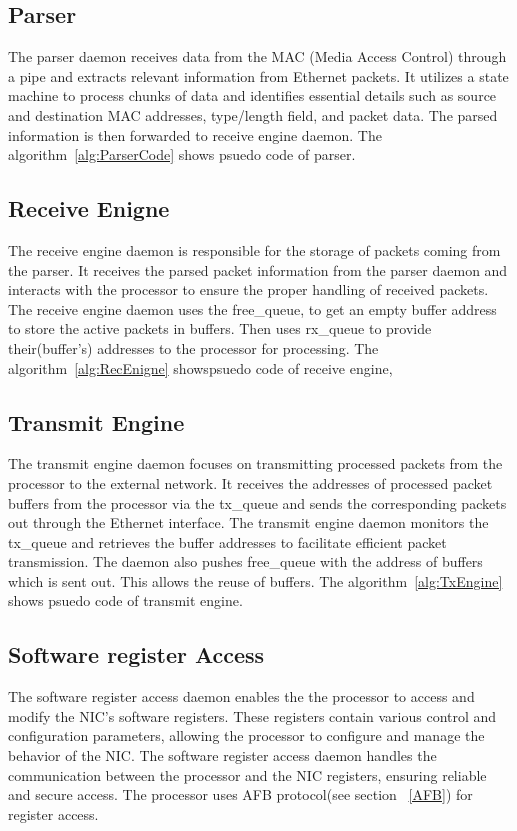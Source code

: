 \documentclass[12pt]{report}
\begin{document}
		\subsection{Parser}
				The parser daemon receives data from the MAC (Media Access Control) through a pipe and extracts relevant information from Ethernet packets. It utilizes a state machine to process chunks of data and identifies essential details such as source and destination MAC addresses, type/length field, and packet data. The parsed information is then forwarded to receive engine daemon. The algorithm~\ref{alg:ParserCode} shows psuedo code of parser.

		\subsection{Receive Enigne}
				The receive engine daemon is responsible for the storage of packets coming from the parser. It receives the parsed packet information from the parser daemon and interacts with the processor to ensure the proper handling of received packets. The receive engine daemon uses the free\_queue, to get an empty buffer address to store the active packets in buffers.
			Then uses rx\_queue to provide their(buffer's) addresses to the processor for processing. The algorithm~\ref{alg:RecEnigne} showspsuedo code of receive engine,
		\subsection{Transmit Engine}
				The transmit engine daemon focuses on transmitting processed packets from the processor to the external network. It receives the addresses of processed packet buffers from the processor via the tx\_queue and sends the corresponding packets out through the Ethernet interface. The transmit engine daemon monitors the tx\_queue and retrieves the buffer addresses to facilitate efficient packet transmission. The daemon also pushes free\_queue with the address of buffers which is sent out. This allows the reuse of buffers. The algorithm~\ref{alg:TxEngine} shows psuedo code of transmit engine.
			\subsection{Software register Access}
				The software register access daemon enables the the processor to access and modify the NIC's software registers. These registers contain various control and configuration parameters, allowing the processor to configure and manage the behavior of the NIC. The software register access daemon handles the communication between the processor and the NIC registers, ensuring reliable and secure access. The processor uses AFB protocol(see section ~\ref{AFB}) for register access.\\
\end{document}
